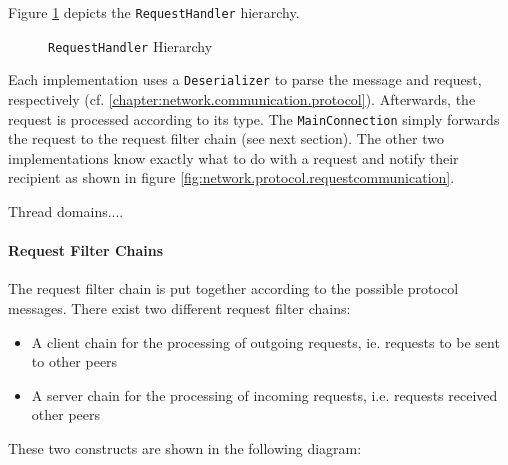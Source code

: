 Figure \ref{fig:network.protocol.requesthandler.uml} depicts the \texttt{RequestHandler} hierarchy.

\begin{figure}[H]
 \centering
 \caption{\texttt{RequestHandler} Hierarchy}
 \label{fig:network.protocol.requesthandler.uml}
\end{figure}

Each implementation uses a \texttt{Deserializer} to parse the message and request, respectively (cf. \ref{chapter:network.communication.protocol}). Afterwards, the request is processed according to its type. The \texttt{MainConnection} simply forwards the request to the request filter chain (see next section). The other two implementations know exactly what to do with a request and notify their recipient as shown in figure \ref{fig:network.protocol.requestcommunication}.


Thread domains....


\paragraph{Request Filter Chains}
\label{chapter:networkfilterchains}

The request filter chain is put together according to the possible protocol messages. There exist two different request filter chains: 

\begin{itemize}
 \item A client chain for the processing of outgoing requests, ie. requests to be sent to other peers
 \item A server chain for the processing of incoming requests, i.e. requests received other peers
\end{itemize}

These two constructs are shown in the following diagram:


